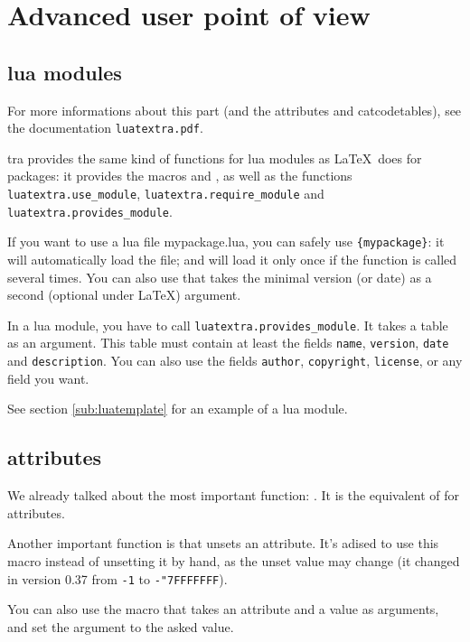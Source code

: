 \documentclass{article}
\begin{document}
\section{Advanced user point of view}

\subsection{lua modules}

For more informations about this part (and the attributes and catcodetables), see the documentation \texttt{luatextra.pdf}.

\LuaTeX tra provides the same kind of functions for lua modules as \LaTeX\ does for packages: it provides the macros \texttt{\string\luaUseModule} and \texttt{\string\luaRequireModule}, as well as the functions \texttt{luatextra.use\_module}, \texttt{luatextra.require\_module} and \texttt{luatextra.provides\_module}.

If you want to use a lua file mypackage.lua, you can safely use \texttt{\string\luaUseModule\{mypackage\}}: it will automatically load the file; and will load it only once if the function is called several times. You can also use \texttt{\string\luaRequireModule} that takes the minimal version (or date) as a second (optional under \LaTeX ) argument.

In a lua module, you have to call \texttt{luatextra.provides\_module}. It takes a table as an argument. This table must contain at least the fields \texttt{name}, \texttt{version}, \texttt{date} and \texttt{description}. You can also use the fields \texttt{author}, \texttt{copyright}, \texttt{license}, or any field you want.

See section \ref{sub:luatemplate} for an example of a lua module.

\subsection{attributes}

We already talked about the most important function: \texttt{\string\newluaattribute}. It is the equivalent of \texttt{\string\newcount} for attributes.

Another important function is \texttt{\string\unsetluaattribute} that unsets an attribute. It's adised to use this macro instead of unsetting it by hand, as the unset value may change (it changed in version 0.37 from \texttt{-1} to \texttt{-"7FFFFFFF}).

You can also use the macro \texttt{\string\setluaattribute} that takes an attribute and a value as arguments, and set the argument to the asked value.
\end{document}
